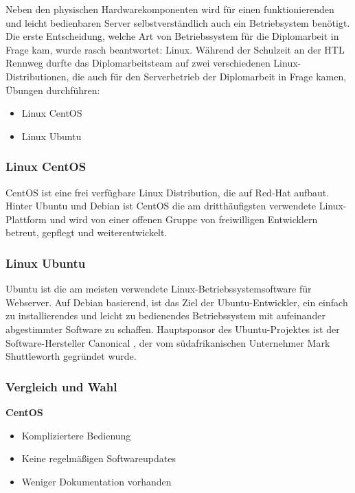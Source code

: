\documentclass[
]{article}
\providecommand{\tightlist}{%
  \setlength{\itemsep}{0pt}\setlength{\parskip}{0pt}}
\begin{document}
Neben den physischen Hardwarekomponenten wird für einen funktionierenden
und leicht bedienbaren Server selbstverständlich auch ein Betriebsystem
benötigt. Die erste Entscheidung, welche Art von Betriebssystem für die
Diplomarbeit in Frage kam, wurde rasch beantwortet: Linux. Während der
Schulzeit an der HTL Rennweg durfte das Diplomarbeitsteam auf zwei
verschiedenen Linux-Distributionen, die auch für den Serverbetrieb der
Diplomarbeit in Frage kamen, Übungen durchführen:

\begin{itemize}
\tightlist
\item
  Linux CentOS
\item
  Linux Ubuntu
\end{itemize}

\hypertarget{linux-centos}{%
\subsubsection{Linux CentOS}\label{linux-centos}}

CentOS ist eine frei verfügbare Linux Distribution, die auf Red-Hat
\cite{redhat} aufbaut. Hinter Ubuntu und Debian ist CentOS die am
dritthäufigsten verwendete Linux-Plattform und wird von einer offenen
Gruppe von freiwilligen Entwicklern betreut, gepflegt und
weiterentwickelt.

\hypertarget{linux-ubuntu}{%
\subsubsection{Linux Ubuntu}\label{linux-ubuntu}}

Ubuntu ist die am meisten verwendete Linux-Betriebssystemsoftware für
Webserver. Auf Debian basierend, ist das Ziel der Ubuntu-Entwickler, ein
einfach zu installierendes und leicht zu bedienendes Betriebssystem mit
aufeinander abgestimmter Software zu schaffen. Hauptsponsor des
Ubuntu-Projektes ist der Software-Hersteller Canonical \cite{canonical},
der vom südafrikanischen Unternehmer Mark Shuttleworth \cite{mark}
gegründet wurde.

\hypertarget{vergleich-und-wahl}{%
\subsubsection{\texorpdfstring{Vergleich und Wahl
\cite{wahl}}{Vergleich und Wahl }}\label{vergleich-und-wahl}}

\textbf{CentOS}

\begin{itemize}
\tightlist
\item
  Kompliziertere Bedienung
\item
  Keine regelmäßigen Softwareupdates
\item
  Weniger Dokumentation vorhanden
\end{itemize}
\end{document}
